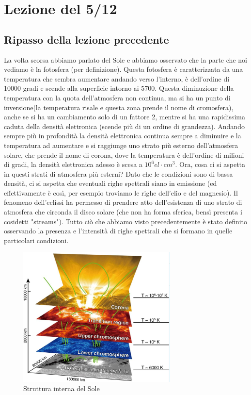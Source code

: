 \documentclass[a4paper,11pt]{article}
\begin{document}
        
\newpage
\section{Lezione del 5/12}
\subsection{Ripasso della lezione precedente}
La volta scorsa abbiamo parlato del Sole e abbiamo osservato che la parte che noi vediamo è la fotosfera (per definizione). Questa fotosfera è caratterizzata da una temperatura che sembra aumentare andando verso l'interno, è dell'ordine di 10000 gradi e scende alla superficie intorno ai 5700.
Questa diminuzione della temperatura con la quota dell'atmosfera non continua, ma si ha un punto di inversione(la temperatura risale e questa zona prende il nome di cromosfera), anche se si ha un cambiamento solo di un fattore 2, mentre si ha una rapidissima caduta della densità elettronica (scende più di un ordine di grandezza). Andando sempre più in profondità la densità elettronica continua sempre a diminuire e la temperatura ad aumentare e si raggiunge uno strato più esterno dell'atmosfera solare, che prende il nome di corona, dove la temperatura è dell'ordine di milioni di gradi, la densità elettronica adesso è scesa a  $ 10 ^{6} el\cdot cm^{3}$. 
Ora, cosa ci si aspetta in questi strati di atmosfera più esterni? Dato che le condizioni sono di bassa densità, ci si aspetta che eventuali righe spettrali siano in emissione (ed effettivamente è così, per esempio troviamo le righe dell'elio e del magnesio).
Il fenomeno dell'eclissi ha permesso di prendere atto dell'esistenza di uno strato di atmosfera che circonda il disco solare (che non ha forma sferica, bensì presenta i cosidetti "streams").
Tutto ciò che abbiamo visto precedentemente è stato definito osservando la presenza e l'intensità di righe spettrali che si formano in quelle particolari condizioni.
\begin{figure}[h!!]
        \centering
        \includegraphics[width=8cm]{Struttura interna del Sole.JPG}
        \caption{Struttura interna del Sole}
        \label{fig:Struttura interna del Sole}
    \end{figure}
\end{document}
